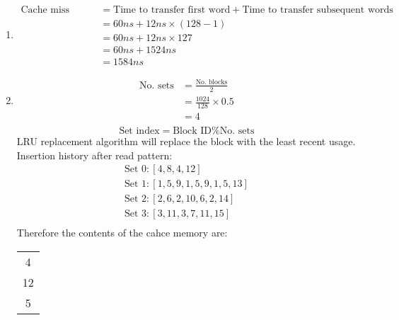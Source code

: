 \documentclass{article}
\begin{document}
\begin{enumerate}[label=(\alph*)]
    \item \begin{align*}
              \text{Cache miss penalty} & = \text{Time to transfer first word} + \text{Time to transfer subsequent words} \\
                                        & = 60ns + 12ns \times (128 - 1)                                                  \\
                                        & = 60ns + 12ns \times 127                                                        \\
                                        & = 60ns + 1524ns                                                                 \\
                                        & = 1584ns
          \end{align*}
    \item \begin{align*}
              \text{No. sets} & = \frac{\text{No. blocks} }2  \\
                              & = \frac{1024}{128} \times 0.5 \\
                              & = 4                           \\
          \end{align*}
          \[
              \text{Set index} = \text{Block ID} \% \text{No. sets}
          \]
          LRU replacement algorithm will replace the block with the least recent usage. Insertion history after read pattern:
          \begin{align*}
              \text{Set } 0 : [4,8,4,12]           \\
              \text{Set } 1 : [1,5,9,1,5,9,1,5,13] \\
              \text{Set } 2 : [2,6,2,10,6,2,14]    \\
              \text{Set } 3 : [3,11,3,7,11,15]     \\
          \end{align*}
          Therefore the contents of the cahce memory are:
          \begin{table}[h]
              \centering
              \begin{tabular}{|c|}
                  \hline
                  4  \\
                  12 \\
                  \hline
                  5  \\

\end{tabular}
\end{table}
\end{enumerate}
\end{document}
